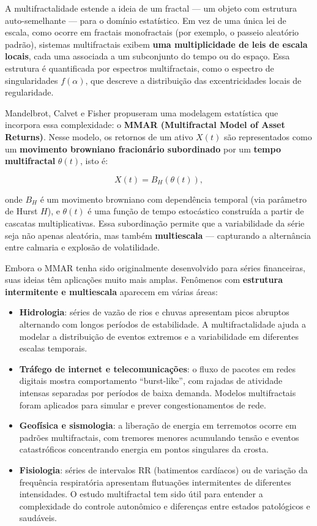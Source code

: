 \documentclass[
]{agujournal2019}
\providecommand{\tightlist}{%
  \setlength{\itemsep}{0pt}\setlength{\parskip}{0pt}}\usepackage{longtable,booktabs,array}
\begin{document}
A multifractalidade estende a ideia de um fractal --- um objeto com
estrutura auto-semelhante --- para o domínio estatístico. Em vez de uma
única lei de escala, como ocorre em fractais monofractais (por exemplo,
o passeio aleatório padrão), sistemas multifractais exibem \textbf{uma
multiplicidade de leis de escala locais}, cada uma associada a um
subconjunto do tempo ou do espaço. Essa estrutura é quantificada por
espectros multifractais, como o espectro de singularidades
\(f(\alpha)\), que descreve a distribuição das excentricidades locais de
regularidade.

Mandelbrot, Calvet e Fisher propuseram uma modelagem estatística que
incorpora essa complexidade: o \textbf{MMAR (Multifractal Model of Asset
Returns)}. Nesse modelo, os retornos de um ativo \(X(t)\) são
representados como um \textbf{movimento browniano fracionário
subordinado} por um \textbf{tempo multifractal} \(\theta(t)\), isto é:

\[
X(t) = B_H(\theta(t)),
\]

onde \(B_H\) é um movimento browniano com dependência temporal (via
parâmetro de Hurst \(H\)), e \(\theta(t)\) é uma função de tempo
estocástico construída a partir de cascatas multiplicativas. Essa
subordinação permite que a variabilidade da série seja não apenas
aleatória, mas também \textbf{multiescala} --- capturando a alternância
entre calmaria e explosão de volatilidade.

Embora o MMAR tenha sido originalmente desenvolvido para séries
financeiras, suas ideias têm aplicações muito mais amplas. Fenômenos com
\textbf{estrutura intermitente e multiescala} aparecem em várias áreas:

\begin{itemize}
\tightlist
\item
  \textbf{Hidrologia}: séries de vazão de rios e chuvas apresentam picos
  abruptos alternando com longos períodos de estabilidade. A
  multifractalidade ajuda a modelar a distribuição de eventos extremos e
  a variabilidade em diferentes escalas temporais.
\item
  \textbf{Tráfego de internet e telecomunicações}: o fluxo de pacotes em
  redes digitais mostra comportamento ``burst-like'', com rajadas de
  atividade intensas separadas por períodos de baixa demanda. Modelos
  multifractais foram aplicados para simular e prever congestionamentos
  de rede.
\item
  \textbf{Geofísica e sismologia}: a liberação de energia em terremotos
  ocorre em padrões multifractais, com tremores menores acumulando
  tensão e eventos catastróficos concentrando energia em pontos
  singulares da crosta.
\item
  \textbf{Fisiologia}: séries de intervalos RR (batimentos cardíacos) ou
  de variação da frequência respiratória apresentam flutuações
  intermitentes de diferentes intensidades. O estudo multifractal tem
  sido útil para entender a complexidade do controle autonômico e
  diferenças entre estados patológicos e saudáveis.
\end{itemize}
\end{document}
